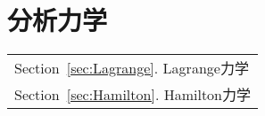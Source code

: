 \part{分析力学}\label{Part:Analytical}
	\begin{margintable}\vspace{1.4in}\footnotesize
		\begin{tabularx}{\marginparwidth}{|X}
			Section~\ref{sec:Lagrange}. Lagrange力学\\
			Section~\ref{sec:Hamilton}. Hamilton力学\\
		\end{tabularx}
	\end{margintable}

